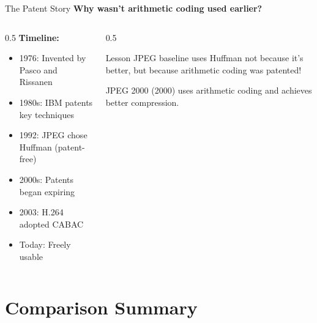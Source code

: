 \documentclass[aspectratio=169,12pt]{beamer}
\begin{document}
\begin{frame}{The Patent Story}
    \textbf{Why wasn't arithmetic coding used earlier?}
    
    \vspace{0.5cm}
    \begin{columns}
        \begin{column}{0.5\textwidth}
            \textbf{Timeline:}
            \begin{itemize}
                \item 1976: Invented by Pasco and Rissanen
                \item 1980s: IBM patents key techniques
                \item 1992: JPEG chose Huffman (patent-free)
                \item 2000s: Patents began expiring
                \item 2003: H.264 adopted CABAC
                \item Today: Freely usable
            \end{itemize}
        \end{column}
        \begin{column}{0.5\textwidth}
            \begin{alertblock}{Lesson}
                JPEG baseline uses Huffman not because it's better, but because arithmetic coding was patented!
                
                \vspace{0.2cm}
                JPEG 2000 (2000) uses arithmetic coding and achieves better compression.
            \end{alertblock}
        \end{column}
    \end{columns}
\end{frame}

\section{Comparison Summary}
\end{document}
